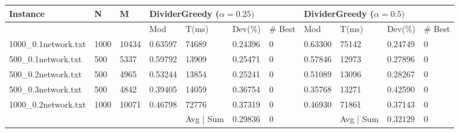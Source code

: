 \begin{sidewaystable}
	\begin{tabular}{lllllllllll}
		\hline
		\multicolumn{1}{|l|}{Instance}             & \multicolumn{1}{l|}{N}    & \multicolumn{1}{l|}{M}     & \multicolumn{4}{l|}{DividerGreedy ($\alpha = 0.25)$}                                                                                 & \multicolumn{4}{l|}{DividerGreedy ($\alpha = 0.5)$}                                                                                  \\ \hline
		\multicolumn{1}{|l|}{}                     & \multicolumn{1}{l|}{}     & \multicolumn{1}{l|}{}      & \multicolumn{1}{l|}{Mod}     & \multicolumn{1}{l|}{T(ms)} & \multicolumn{1}{l|}{Dev(\%)} & \multicolumn{1}{l|}{\# Best} & \multicolumn{1}{l|}{Mod}     & \multicolumn{1}{l|}{T(ms)} & \multicolumn{1}{l|}{Dev(\%)} & \multicolumn{1}{l|}{\# Best} \\ \hline
		\multicolumn{1}{|l|}{1000\_0.1network.txt} & \multicolumn{1}{l|}{1000} & \multicolumn{1}{l|}{10434} & \multicolumn{1}{l|}{0.63597} & \multicolumn{1}{l|}{74689} & \multicolumn{1}{l|}{0.24396} & \multicolumn{1}{l|}{0}       & \multicolumn{1}{l|}{0.63300} & \multicolumn{1}{l|}{75142} & \multicolumn{1}{l|}{0.24749} & \multicolumn{1}{l|}{0}       \\ \hline
		\multicolumn{1}{|l|}{500\_0.1network.txt}  & \multicolumn{1}{l|}{500}  & \multicolumn{1}{l|}{5337}  & \multicolumn{1}{l|}{0.59792} & \multicolumn{1}{l|}{13909} & \multicolumn{1}{l|}{0.25471} & \multicolumn{1}{l|}{0}       & \multicolumn{1}{l|}{0.57846} & \multicolumn{1}{l|}{12973} & \multicolumn{1}{l|}{0.27896} & \multicolumn{1}{l|}{0}       \\ \hline
		\multicolumn{1}{|l|}{500\_0.2network.txt}  & \multicolumn{1}{l|}{500}  & \multicolumn{1}{l|}{4965}  & \multicolumn{1}{l|}{0.53244} & \multicolumn{1}{l|}{13854} & \multicolumn{1}{l|}{0.25241} & \multicolumn{1}{l|}{0}       & \multicolumn{1}{l|}{0.51089} & \multicolumn{1}{l|}{13096} & \multicolumn{1}{l|}{0.28267} & \multicolumn{1}{l|}{0}       \\ \hline
		\multicolumn{1}{|l|}{500\_0.3network.txt}  & \multicolumn{1}{l|}{500}  & \multicolumn{1}{l|}{4842}  & \multicolumn{1}{l|}{0.39405} & \multicolumn{1}{l|}{14059} & \multicolumn{1}{l|}{0.36754} & \multicolumn{1}{l|}{0}       & \multicolumn{1}{l|}{0.35768} & \multicolumn{1}{l|}{13271} & \multicolumn{1}{l|}{0.42590} & \multicolumn{1}{l|}{0}       \\ \hline
		\multicolumn{1}{|l|}{1000\_0.2network.txt} & \multicolumn{1}{l|}{1000} & \multicolumn{1}{l|}{10071} & \multicolumn{1}{l|}{0.46798} & \multicolumn{1}{l|}{72776} & \multicolumn{1}{l|}{0.37319} & \multicolumn{1}{l|}{0}       & \multicolumn{1}{l|}{0.46930} & \multicolumn{1}{l|}{71861} & \multicolumn{1}{l|}{0.37143} & \multicolumn{1}{l|}{0}       \\ \hline
		&                           &                            &                              & Avg | Sum                           & 0.29836                      & 0                            &                              & Avg | Sum                           & 0.32129                      & 0                           
	\end{tabular}


\end{sidewaystable}
